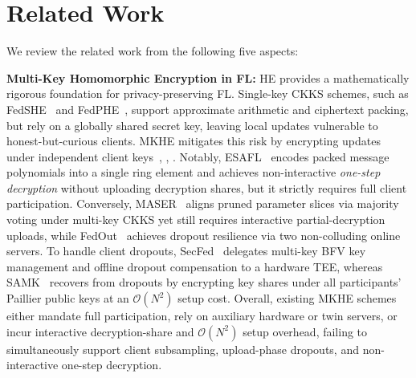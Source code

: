 \section{Related Work}
\label{sec:related_work}

We review the related work from the following five aspects:

\textbf{Multi-Key Homomorphic Encryption in FL:} HE provides a mathematically rigorous foundation for privacy-preserving FL. Single-key CKKS schemes, such as FedSHE~\cite{pan2024fedshe} and FedPHE~\cite{li2025fedphe}, support approximate arithmetic and ciphertext packing, but rely on a globally shared secret key, leaving local updates vulnerable to honest-but-curious clients. MKHE mitigates this risk by encrypting updates under independent client keys~\cite{chen2019efficient}, \cite{damgaard2012multiparty}, \cite{wu2025secure}. Notably, ESAFL~\cite{wu2025esafl} encodes packed message polynomials into a single ring element and achieves non-interactive \emph{one-step decryption} without uploading decryption shares, but it strictly requires full client participation. Conversely, MASER~\cite{al2025maser} aligns pruned parameter slices via majority voting under multi-key CKKS yet still requires interactive partial-decryption uploads, while FedOut~\cite{yuan2026fedout} achieves dropout resilience via two non-colluding online servers. To handle client dropouts, SecFed~\cite{cai2023secfed} delegates multi-key BFV key management and offline dropout compensation to a hardware TEE, whereas SAMK~\cite{li2025samk} recovers from dropouts by encrypting key shares under all participants' Paillier public keys at an $\mathcal{O}(N^2)$ setup cost. Overall, existing MKHE schemes either mandate full participation, rely on auxiliary hardware or twin servers, or incur interactive decryption-share and $\mathcal{O}(N^2)$ setup overhead, failing to simultaneously support client subsampling, upload-phase dropouts, and non-interactive one-step decryption.

